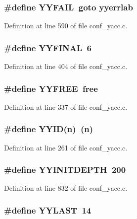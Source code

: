\subsubsection[{YYFAIL}]{\setlength{\rightskip}{0pt plus 5cm}\#define YYFAIL~goto yyerrlab}\label{conf__yacc_8c_a383d9671b1abd97e4c6f3708d1ca32f3}


Definition at line 590 of file conf\_\-yacc.c.
\subsubsection[{YYFINAL}]{\setlength{\rightskip}{0pt plus 5cm}\#define YYFINAL~6}\label{conf__yacc_8c_a6419f3fd69ecb6b7e063410fd4e73b2f}


Definition at line 404 of file conf\_\-yacc.c.
\subsubsection[{YYFREE}]{\setlength{\rightskip}{0pt plus 5cm}\#define YYFREE~free}\label{conf__yacc_8c_ac8adfd73c006c1926f387feb1eced3ca}


Definition at line 337 of file conf\_\-yacc.c.
\subsubsection[{YYID}]{\setlength{\rightskip}{0pt plus 5cm}\#define YYID(n)~(n)}\label{conf__yacc_8c_a0a6ff515042340dd341cf6ca8dd05f2d}


Definition at line 261 of file conf\_\-yacc.c.
\subsubsection[{YYINITDEPTH}]{\setlength{\rightskip}{0pt plus 5cm}\#define YYINITDEPTH~200}\label{conf__yacc_8c_aeb1508a3a38ec5d64c27e8eca25330b5}


Definition at line 832 of file conf\_\-yacc.c.
\subsubsection[{YYLAST}]{\setlength{\rightskip}{0pt plus 5cm}\#define YYLAST~14}\label{conf__yacc_8c_ae67923760a28e3b7ed3aa2cfaef7f9a2}


